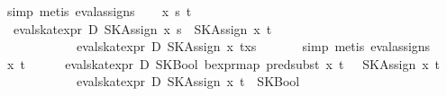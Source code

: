 \begin{isabellebody}
\ {}simp{}\ metis\ eval{}assigns{}{}\isanewline
{}\isamarkupfalse%
\isanewline
\ \ \isamarkupfalse%
\ x\ s\ t\isanewline
\ \ \isamarkupfalse%
\ {}{}{}{}\ eval{}skat{}expr\ D\ {}SKAssign\ x\ s\ {}\ SKAssign\ x\ t{}\ {}\ {}\isanewline
\ \ \ \ \ \ \ \ \ \ \ \ eval{}skat{}expr\ D\ {}SKAssign\ x\ {}t{}x{}s{}{}{}\ {}{}\isanewline
\ \ \ \ \isamarkupfalse%
\ {}simp{}\ metis\ eval{}assigns{}{}\isanewline
{}\isamarkupfalse%
\isanewline
\ \ \isamarkupfalse%
\ x\ t\ {}\isanewline
\ \ \isamarkupfalse%
\ {}{}{}{}\ eval{}skat{}expr\ D\ {}SKBool\ {}bexpr{}map\ {}pred{}subst\ x\ t{}\ {}{}\ {}\ SKAssign\ x\ t{}\ {}\ {}\isanewline
\ \ \ \ \ \ \ \ \ \ \ \ eval{}skat{}expr\ D\ {}SKAssign\ x\ t\ {}\ SKBool\ {}{}\ {}{}\isanewline

\end{isabellebody}
